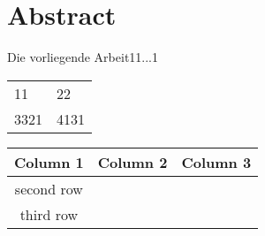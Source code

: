 \chapter{Abstract}
\label{chap:Einleitung}


Die vorliegende Arbeit11...1

\begin{tabular}{|ll|}
\hline
11   & 22   \\
3321 & 4131 \\
\hline
\end{tabular}

 
\begin{tabular}{|c|c|c|}
        \hline
        Column 1 & Column 2 & Column 3 \\
        \hline
        second row & & \\
        \hline
        third row & & \\
        \hline
\end{tabular}



